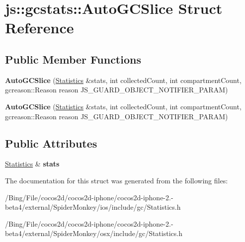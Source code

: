\hypertarget{structjs_1_1gcstats_1_1_auto_g_c_slice}{\section{js\-:\-:gcstats\-:\-:Auto\-G\-C\-Slice Struct Reference}
\label{structjs_1_1gcstats_1_1_auto_g_c_slice}
}
\subsection*{Public Member Functions}
\begin{DoxyCompactItemize}
\item 
\hypertarget{structjs_1_1gcstats_1_1_auto_g_c_slice_ad751f007123968ad6dc682b330f2d8e2}{{\bfseries Auto\-G\-C\-Slice} (\hyperlink{structjs_1_1gcstats_1_1_statistics}{Statistics} \&stats, int collected\-Count, int compartment\-Count, gcreason\-::\-Reason reason J\-S\-\_\-\-G\-U\-A\-R\-D\-\_\-\-O\-B\-J\-E\-C\-T\-\_\-\-N\-O\-T\-I\-F\-I\-E\-R\-\_\-\-P\-A\-R\-A\-M)}\label{structjs_1_1gcstats_1_1_auto_g_c_slice_ad751f007123968ad6dc682b330f2d8e2}

\item 
\hypertarget{structjs_1_1gcstats_1_1_auto_g_c_slice_ad751f007123968ad6dc682b330f2d8e2}{{\bfseries Auto\-G\-C\-Slice} (\hyperlink{structjs_1_1gcstats_1_1_statistics}{Statistics} \&stats, int collected\-Count, int compartment\-Count, gcreason\-::\-Reason reason J\-S\-\_\-\-G\-U\-A\-R\-D\-\_\-\-O\-B\-J\-E\-C\-T\-\_\-\-N\-O\-T\-I\-F\-I\-E\-R\-\_\-\-P\-A\-R\-A\-M)}\label{structjs_1_1gcstats_1_1_auto_g_c_slice_ad751f007123968ad6dc682b330f2d8e2}

\end{DoxyCompactItemize}
\subsection*{Public Attributes}
\begin{DoxyCompactItemize}
\item 
\hypertarget{structjs_1_1gcstats_1_1_auto_g_c_slice_a13e634467504772c2816cf4a6340e450}{\hyperlink{structjs_1_1gcstats_1_1_statistics}{Statistics} \& {\bfseries stats}}\label{structjs_1_1gcstats_1_1_auto_g_c_slice_a13e634467504772c2816cf4a6340e450}

\end{DoxyCompactItemize}


The documentation for this struct was generated from the following files\-:\begin{DoxyCompactItemize}
\item 
/\-Bing/\-File/cocos2d/cocos2d-\/iphone/cocos2d-\/iphone-\/2.-\/beta4/external/\-Spider\-Monkey/ios/include/gc/Statistics.\-h\item 
/\-Bing/\-File/cocos2d/cocos2d-\/iphone/cocos2d-\/iphone-\/2.-\/beta4/external/\-Spider\-Monkey/osx/include/gc/Statistics.\-h\end{DoxyCompactItemize}
